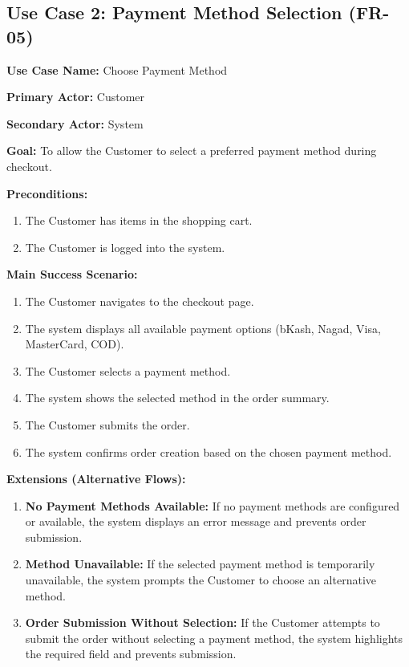 \subsection*{Use Case 2: Payment Method Selection (FR-05)}

\textbf{Use Case Name:} Choose Payment Method

\textbf{Primary Actor:} Customer

\textbf{Secondary Actor:} System

\textbf{Goal:} To allow the Customer to select a preferred payment method during checkout.

\textbf{Preconditions:}
\begin{enumerate}
    \item The Customer has items in the shopping cart.
    \item The Customer is logged into the system.
\end{enumerate}

\textbf{Main Success Scenario:}
\begin{enumerate}
    \item The Customer navigates to the checkout page.
    \item The system displays all available payment options (bKash, Nagad, Visa, MasterCard, COD).
    \item The Customer selects a payment method.
    \item The system shows the selected method in the order summary.
    \item The Customer submits the order.
    \item The system confirms order creation based on the chosen payment method.
\end{enumerate}

\textbf{Extensions (Alternative Flows):}
\begin{enumerate}
    \item[2a.] \textbf{No Payment Methods Available:} If no payment methods are configured or available, the system displays an error message and prevents order submission.
    \item[3a.] \textbf{Method Unavailable:} If the selected payment method is temporarily unavailable, the system prompts the Customer to choose an alternative method.
    \item[5a.] \textbf{Order Submission Without Selection:} If the Customer attempts to submit the order without selecting a payment method, the system highlights the required field and prevents submission.
\end{enumerate}

